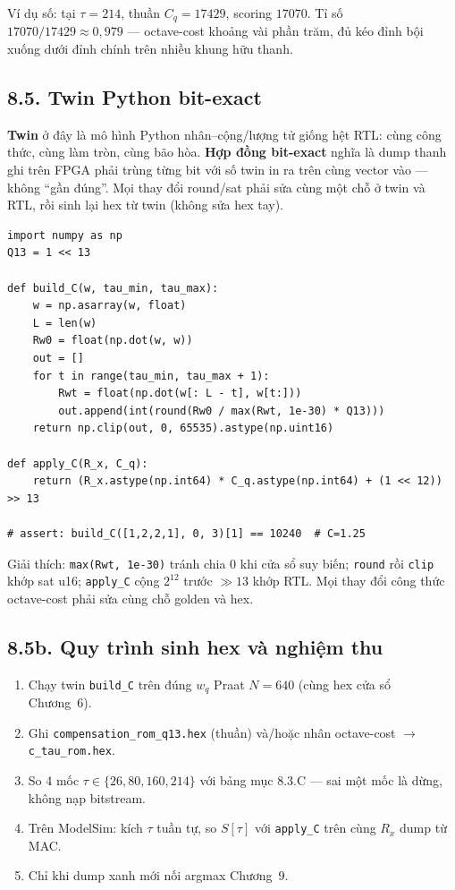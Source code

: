 Ví dụ số: tại $\tau=214$, thuần $C_q=17429$, scoring $17070$. Tỉ số $17070/17429\approx 0{,}979$ --- octave-cost khoảng vài phần trăm, đủ kéo đỉnh bội xuống dưới đỉnh chính trên nhiều khung hữu thanh.

\subsection*{8.5. Twin Python bit-exact}

\textbf{Twin} ở đây là mô hình Python nhân--cộng/lượng tử giống hệt RTL: cùng công thức, cùng làm tròn, cùng bão hòa. \textbf{Hợp đồng bit-exact} nghĩa là dump thanh ghi trên FPGA phải trùng từng bit với số twin in ra trên cùng vector vào --- không ``gần đúng''. Mọi thay đổi round/sat phải sửa cùng một chỗ ở twin và RTL, rồi sinh lại hex từ twin (không sửa hex tay).

\begin{verbatim}
import numpy as np
Q13 = 1 << 13

def build_C(w, tau_min, tau_max):
    w = np.asarray(w, float)
    L = len(w)
    Rw0 = float(np.dot(w, w))
    out = []
    for t in range(tau_min, tau_max + 1):
        Rwt = float(np.dot(w[: L - t], w[t:]))
        out.append(int(round(Rw0 / max(Rwt, 1e-30) * Q13)))
    return np.clip(out, 0, 65535).astype(np.uint16)

def apply_C(R_x, C_q):
    return (R_x.astype(np.int64) * C_q.astype(np.int64) + (1 << 12)) >> 13

# assert: build_C([1,2,2,1], 0, 3)[1] == 10240  # C=1.25
\end{verbatim}
Giải thích: \texttt{max(Rwt, 1e-30)} tránh chia 0 khi cửa sổ suy biến; \texttt{round} rồi \texttt{clip} khớp sat u16; \texttt{apply\_C} cộng $2^{12}$ trước $\gg 13$ khớp RTL. Mọi thay đổi công thức octave-cost phải sửa cùng chỗ golden và hex.


\subsection*{8.5b. Quy trình sinh hex và nghiệm thu}

\begin{enumerate}[leftmargin=1.4em]
\item Chạy twin \texttt{build\_C} trên đúng $w_q$ Praat $N=640$ (cùng hex cửa sổ Chương~6).
\item Ghi \texttt{compensation\_rom\_q13.hex} (thuần) và/hoặc nhân octave-cost $\to$ \texttt{c\_tau\_rom.hex}.
\item So 4 mốc $\tau\in\{26,80,160,214\}$ với bảng mục 8.3.C --- sai một mốc là dừng, không nạp bitstream.
\item Trên ModelSim: kích $\tau$ tuần tự, so $S[\tau]$ với \texttt{apply\_C} trên cùng $R_x$ dump từ MAC.
\item Chỉ khi dump xanh mới nối argmax Chương~9.
\end{enumerate}

